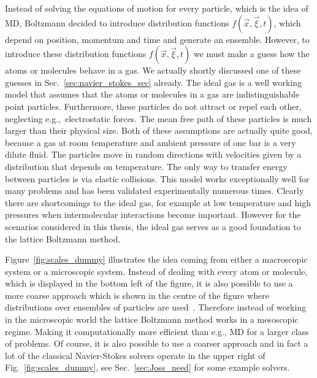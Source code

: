 Instead of solving the equations of motion for every particle, which is the idea of MD, Boltzmann decided to introduce distribution functions $f(\vec{x},\vec{\xi},t)$, which depend on position, momentum and time and generate an ensemble.
However, to introduce these distribution functions $f(\vec{x},\vec{\xi},t)$ we must make a guess how the atoms or molecules behave in a gas.
We actually shortly discussed one of these guesses in Sec.~\ref{sec:navier_stokes_sec} already. 
The ideal gas is a well working model that assumes that the atoms or molecules in a gas are indistinguishable point particles. 
Furthermore, these particles do not attract or repel each other, neglecting e.g.,~electrostatic forces.
The mean free path of these particles is much larger than their physical size.
Both of these assumptions are actually quite good, because a gas at room temperature and ambient pressure of one bar is a very dilute fluid.
The particles move in random directions with velocities given by a distribution that depends on temperature. 
The only way to transfer energy between particles is via elastic collisions.
This model works exceptionally well for many problems and has been validated experimentally numerous times.
Clearly there are shortcomings to the ideal gas, for example at low temperature and high pressures when intermolecular interactions become important.
However for the scenarios considered in this thesis, the ideal gas serves as a good foundation to the lattice Boltzmann method.

Figure~\ref{fig:scales_dummy} illustrates the idea coming from either a macroscopic system or a microscopic system.
Instead of dealing with every atom or molecule, which is displayed in the bottom left of the figure, it is also possible to use a more coarse approach which is shown in the centre of the figure where distributions over ensembles of particles are used~\cite{raabeOverviewLatticeBoltzmann2004}.
Therefore instead of working in the microscopic world the lattice Boltzmann method works in a mesoscopic regime.
Making it computationally more efficient than e.g., MD for a larger class of problems.
Of course, it is also possible to use a coarser approach and in fact a lot of the classical Navier-Stokes solvers operate in the upper right of Fig.~\ref{fig:scales_dummy}, see Sec.~\ref{sec:Joss_need} for some example solvers.

